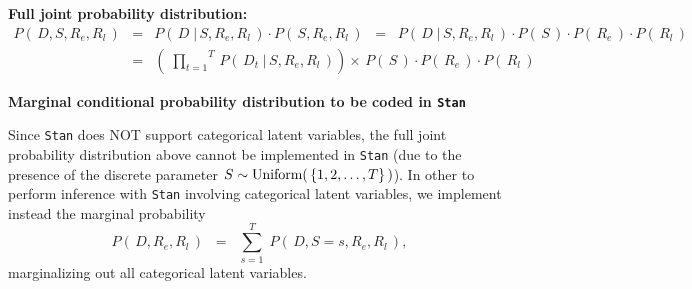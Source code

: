 
\vskip 0.5cm
\noindent
\textbf{Full joint probability distribution:}
\begin{eqnarray*}
P\!\left(\,D,S,R_{e},R_{l}\,\right)
& = &
	P\!\left(\,D \;\vert\, S,R_{e},R_{l}\,\right)
	\cdot
	P\!\left(\,S,R_{e},R_{l}\,\right)
\;\; = \;\;
	P\!\left(\,D \;\vert\, S,R_{e},R_{l}\,\right)
	\cdot
	P\!\left(\,S\,\right)
	\cdot
	P\!\left(\,R_{e}\,\right)
	\cdot
	P\!\left(\,R_{l}\,\right)
\\
& = &
	\left(\;
		\overset{T}{\underset{t=1}{\prod}}\,
		P\!\left(\,D_{t} \;\vert\, S,R_{e},R_{l}\,\right)
		\right)
	\times\,
	P\!\left(\,S\,\right)
	\cdot
	P\!\left(\,R_{e}\,\right)
	\cdot
	P\!\left(\,R_{l}\,\right)
\end{eqnarray*}


\vskip 1.0cm
\noindent
\begin{center}
\textbf{\large Marginal conditional probability distribution to be coded in \texttt{Stan}}
\end{center}
\vskip 0.3cm
\noindent
Since \texttt{Stan} does NOT support categorical latent variables,
the full joint probability distribution above cannot be implemented in \texttt{Stan}
(due to the presence of the discrete parameter $S \sim \textnormal{Uniform}\!\left(\,\{1,2,\ldots,T\}\,\right)$).
In other to perform inference with \texttt{Stan} involving categorical latent variables,
we implement instead the {\color{red}marginal probability}
\begin{equation*}
P\!\left(\,D,R_{e},R_{l}\,\right)
\;\; = \;\;
	\overset{T}{\underset{s=1}{\sum}}\;
	P\!\left(\,D,S=s,R_{e},R_{l}\,\right),
\end{equation*}
marginalizing out all categorical latent variables.

